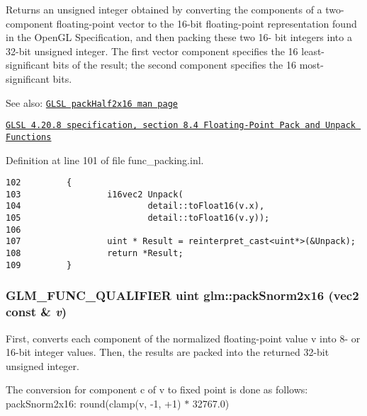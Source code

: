 Returns an unsigned integer obtained by converting the components of a two-component floating-point vector to the 16-bit floating-point representation found in the OpenGL Specification, and then packing these two 16- bit integers into a 32-bit unsigned integer. The first vector component specifies the 16 least-significant bits of the result; the second component specifies the 16 most-significant bits.

\begin{Desc}
\item[See also:]\href{http://www.opengl.org/sdk/docs/manglsl/xhtml/packHalf2x16.xml}{\tt GLSL packHalf2x16 man page} 

\href{http://www.opengl.org/registry/doc/GLSLangSpec.4.20.8.pdf}{\tt GLSL 4.20.8 specification, section 8.4 Floating-Point Pack and Unpack Functions} \end{Desc}


Definition at line 101 of file func\_\-packing.inl.

\begin{Code}\begin{verbatim}102         {
103                 i16vec2 Unpack(
104                         detail::toFloat16(v.x),
105                         detail::toFloat16(v.y));
106 
107                 uint * Result = reinterpret_cast<uint*>(&Unpack);
108                 return *Result;
109         }
\end{verbatim}
\end{Code}


\hypertarget{group__core__func__packing_g0c8005de240d6c4ca3d16c7bee25c622}{
\subsubsection[packSnorm2x16]{\setlength{\rightskip}{0pt plus 5cm}GLM\_\-FUNC\_\-QUALIFIER uint glm::packSnorm2x16 (vec2 const \& {\em v})}}
\label{group__core__func__packing_g0c8005de240d6c4ca3d16c7bee25c622}


First, converts each component of the normalized floating-point value v into 8- or 16-bit integer values. Then, the results are packed into the returned 32-bit unsigned integer.

The conversion for component c of v to fixed point is done as follows: packSnorm2x16: round(clamp(v, -1, +1) $\ast$ 32767.0)

